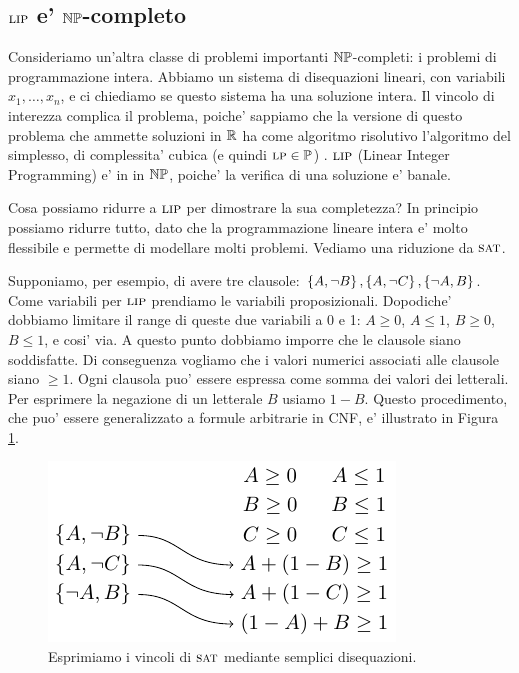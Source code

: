 \subsection{$\textsc{lip}$ e' $\mathbb{NP}$-completo}

Consideriamo un'altra classe di problemi importanti $\mathbb{NP}$-completi: i problemi di
programmazione intera. Abbiamo un sistema di disequazioni lineari, con variabili
$x_{1},\dotsc,x_{n}$, e ci chiediamo se questo sistema ha una soluzione intera. Il vincolo di
interezza complica il problema, poiche' sappiamo che la versione di questo problema che ammette
soluzioni in $\mathbb{R}$ ha come algoritmo risolutivo l'algoritmo del simplesso, di complessita' cubica
(e quindi $\textsc{lp} \in \mathbb{P}$) . $\textsc{lip}$ (Linear Integer Programming) e' in in $\mathbb{NP}$, poiche' la
verifica di una soluzione e' banale.

Cosa possiamo ridurre a $\textsc{lip}$ per dimostrare la sua completezza? In principio possiamo ridurre
tutto, dato che la programmazione lineare intera e' molto flessibile e permette di modellare molti
problemi. Vediamo una riduzione da $\textsc{sat}$.

Supponiamo, per esempio, di avere tre clausole: $\left\{A,\lnot B\right\},\left\{A,\lnot C\right\},\left\{\lnot A,B\right\}$.
Come variabili per $\textsc{lip}$ prendiamo le variabili proposizionali. Dopodiche' dobbiamo limitare il
range di queste due variabili a 0 e 1: $A \geq 0$, $A \leq 1$, $B \geq 0$, $B \leq 1$, e cosi' via.
A questo punto dobbiamo imporre che le clausole siano soddisfatte. Di conseguenza vogliamo che i
valori numerici associati alle clausole siano $\geq 1$. Ogni clausola puo' essere espressa come
somma dei valori dei letterali. Per esprimere la negazione di un letterale $B$ usiamo $1 - B$.
Questo procedimento, che puo' essere generalizzato a formule arbitrarie in CNF, e' illustrato in
Figura \ref{img:SATLIP}.

\begin{figure}[h]
    \begin{center}
        \includegraphics{./img/NPClass/SATLIP.pdf}
        \caption{Esprimiamo i vincoli di $\textsc{sat}$ mediante semplici disequazioni.}
        \label{img:SATLIP}
    \end{center}
\end{figure}


